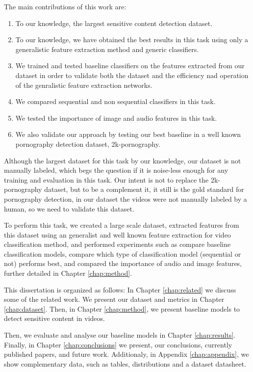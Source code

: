 The main contributions of this work are:
\begin{enumerate}
    \item To our knowledge, the largest sensitive content detection dataset.
    \item To our knowledge, we have obtained the best results in this task using only a generalistic feature extraction method and generic classifiers.
    \item We trained and tested baseline classifiers on the features extracted from our dataset in order to validate both the dataset and the efficiency nad operation of the genralistic feature extraction networks.  
    \item We compared sequential and non sequential classifiers in this task.
    \item We tested the importance of image and audio features in this task.
    \item We also validate our approach by testing our best baseline in a well known pornography detection dataset, 2k-pornography. 
\end{enumerate}
Although the largest dataset for this task by our knowledge, our dataset is not manually labeled, which begs the question if it is noise-less enough for any training and evaluation in this task.  
Our intent is not to replace the 2k-pornography dataset, but to be a complement it, it still is the gold standard for pornography detection, in our dataset the videos were not manually labeled by a human, so we need to validate this dataset.

To perform this task, we created a large scale dataset, extracted features from this dataset using an generalist and well known feature extraction for video classification method, and performed experiments such as compare baseline classification models, compare which type of classification model (sequential or not) performs best, and compared the importance of audio and image features, further detailed in Chapter \ref{chap:method}.

This dissertation is organized as follows:
In Chapter \ref{chap:related} we discuss some of the related work.
We present our dataset and metrics in Chapter \ref{chap:dataset}.
Then, in Chapter \ref{chap:method}, we present baseline models to detect sensitive content in videos.

Then, we evaluate and analyse our baseline models in Chapter \ref{chap:results}.
Finally, in Chapter \ref{chap:conclusions} we present, our conclusions, currently published papers, and future work.
Additionaly, in Appendix \ref{chap:appendix}, we show complementary data, such as tables, distributions and a dataset datasheet.